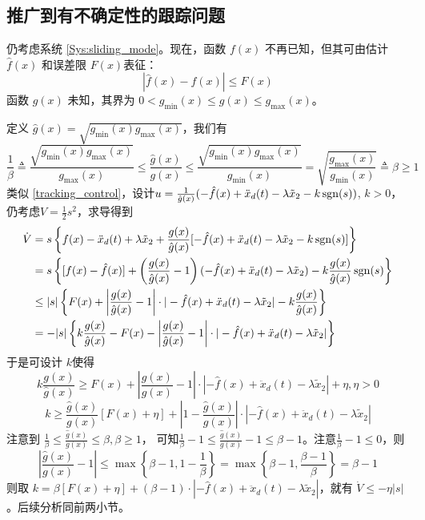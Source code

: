 \subsection{推广到有不确定性的跟踪问题}\label{5C3ref}
仍考虑系统 \eqref{Sys:sliding_mode}。现在，函数 $f (x)$ 不再已知，但其可由估计$\hat{f} (x)$ 和误差限 $F (x)$表征：
\[ | \hat{f} (x) - f (x) | \leq F (x) \]
函数 $g (x)$ 未知，其界为 $0 < g_{\min} (x) \leq g (x) \leq g_{\max}(x)$。

定义 $\hat{g} (x) = \sqrt{g_{\min} (x) g_{\max} (x)}$，我们有
\[ \frac{1}{\beta} \triangleq \frac{\sqrt{g_{\min} (x) g_{\max}
   (x)}}{g_{\max} (x)} \leq \frac{\hat{g} (x)}{g (x)} \leq
   \frac{\sqrt{g_{\min} (x) g_{\max} (x)}}{g_{\min} (x)} =
   \sqrt{\frac{g_{\max} (x)}{g_{\min} (x)}} \triangleq \beta \geq 1 \]
类似 \eqref{tracking_control}，设计$u = \frac{1}{\hat{g} (x)} (- \hat{f} (x) + \ddot{x}_d (t) - \lambda
\tilde{x}_2 - k  \operatorname{sgn} (s))$, $k > 0$，仍考虑$V=\frac12 s^2$，求导得到
\begin{align*}
  \dot{V} & = s \left\{ f (x) - \ddot{x}_d (t) + \lambda \tilde{x}_2 +
  \frac{g (x)}{\hat{g} (x)} [- \hat{f} (x) + \ddot{x}_d (t) - \lambda
  \tilde{x}_2 - k  \operatorname{sgn} (s)] \right\}\\
  & = s \left\{ [f (x) - \hat{f} (x)] + \left( \frac{g (x)}{\hat{g} (x)} -
  1 \right) (- \hat{f} (x) + \ddot{x}_d (t) - \lambda \tilde{x}_2) - k \frac{g
  (x)}{\hat{g} (x)}  \operatorname{sgn} (s) \right\}\\
  & \leq | s | \left\{ F (x) + \left| \frac{g (x)}{\hat{g} (x)} - 1 \right|
  \cdot | - \hat{f} (x) + \ddot{x}_d (t) - \lambda \tilde{x}_2 | - k \frac{g
  (x)}{\hat{g} (x)} \right\}\\
  & = - | s | \left\{ k \frac{g (x)}{\hat{g} (x)} - F (x) - \left| \frac{g
  (x)}{\hat{g} (x)} - 1 \right| \cdot | - \hat{f} (x) + \ddot{x}_d (t) -
  \lambda \tilde{x}_2 | \right\}
\end{align*}
于是可设计 $k$使得
\[ k \frac{g (x)}{\hat{g} (x)} \geq F (x) + \left| \frac{g (x)}{\hat{g} (x)} -
   1 \right| \cdot | - \hat{f} (x) + \ddot{x}_d (t) - \lambda \tilde{x}_2 | +
   \eta, \eta > 0 \]
\[ k \geq \frac{\hat{g} (x)}{g (x)} [F (x) + \eta] + \left| 1 - \frac{\hat{g}
   (x)}{g (x)} \right| \cdot | - \hat{f} (x) + \ddot{x}_d (t) - \lambda
   \tilde{x}_2 | \]
注意到 $\frac{1}{\beta} \leq \frac{\hat{g} (x)}{g (x)} \leq \beta, \beta \geq1$，
可知$ \frac1\beta -1\le \frac{\hat{g}(x)}{g (x)}-1 \le\beta-1 $。注意$\frac1\beta -1\leq0$，则\[\left|  \frac{\hat{g}
   (x)}{g (x)}-1 \right|\leq\max\left\{\beta-1,1-\frac{1}{\beta}\right\}=\max\left\{\beta-1,\frac{\beta-1}{\beta}\right\}=\beta-1\]
则取 $k = \beta [F (x) + \eta] + (\beta - 1) \cdot | - \hat{f} (x) +\ddot{x}_d (t) - \lambda \tilde{x}_2 |$，就有 $\dot{V} \leq - \eta | s|$。后续分析同前两小节。
